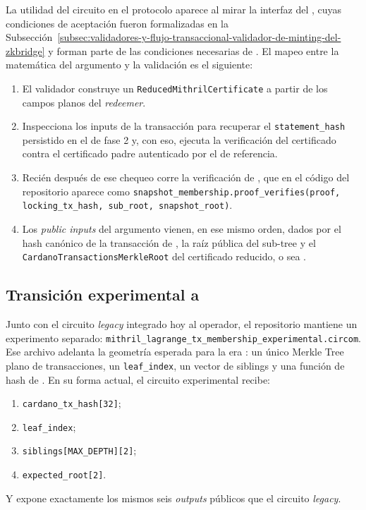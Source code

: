 La utilidad del circuito en el protocolo aparece al mirar la interfaz del \MintingValidator, cuyas condiciones de aceptación fueron formalizadas en la Subsección~\ref{subsec:validadores-y-flujo-transaccional-validador-de-minting-del-zkbridge} y forman parte de las condiciones necesarias de \MintTx. El mapeo entre la matemática del argumento \Groth y la validación \Onchain es el siguiente:
\begin{enumerate}[noitemsep]
	\item El validador construye un \texttt{ReducedMithril\allowbreak Certificate} a partir de los campos planos del \textit{redeemer}.
	\item Inspecciona los inputs de la transacción para recuperar el \texttt{statement\_hash} persistido en el \ProofReceipt de fase 2 y, con eso, ejecuta la verificación del certificado contra el certificado padre autenticado por el \StakeDistributionUTxO de referencia.
	\item Recién después de ese chequeo corre la verificación de \TxSnapshotMembershipCircuit, que en el código del repositorio aparece como \texttt{snapshot\_membership.proof\_verifies(proof, locking\_tx\_hash, sub\_root, snapshot\_root)}.
	\item Los \textit{public inputs} \Onchain del argumento \Groth vienen, en ese mismo orden, dados por el hash canónico de la transacción de \Cardano, la raíz pública del sub-tree \SnapshotSubRoot y el \texttt{CardanoTransactionsMerkleRoot} del certificado reducido, o sea \TxSetRoot.
\end{enumerate}

\subsection{Transición experimental a \Lagrange}
\label{subsec:tx-snapshot-membership-transicion-experimental-a-lagrange}

Junto con el circuito \textit{legacy} integrado hoy al operador, el repositorio mantiene un experimento separado: \texttt{mithril\_lagrange\_tx\_membership\_experimental\allowbreak.circom}. Ese archivo adelanta la geometría esperada para la era \Lagrange: un único Merkle Tree plano de transacciones, un \texttt{leaf\_index}, un vector de siblings y una función de hash \MidnightPoseidonHash de \Midnight. En su forma actual, el circuito experimental recibe:
\begin{enumerate}[noitemsep]
  \item \texttt{cardano\_tx\_hash[32]};
  \item \texttt{leaf\_index};
  \item \texttt{siblings[MAX\_DEPTH][2]};
  \item \texttt{expected\_root[2]}.
\end{enumerate}
Y expone exactamente los mismos seis \textit{outputs} públicos que el circuito \textit{legacy}.

